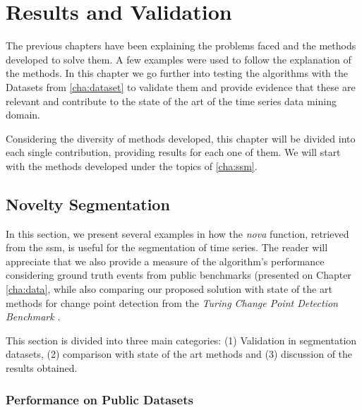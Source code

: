 

%

\chapter{Results and Validation}
\label{cha:results}

The previous chapters have been explaining the problems faced and the methods developed to solve them. A few examples were used to follow the explanation of the methods. In this chapter we go further into testing the algorithms with the Datasets from \ref{cha:dataset} to validate them and provide evidence that these are relevant and contribute to the state of the art of the time series data mining domain.
\par
Considering the diversity of methods developed, this chapter will be divided into each single contribution, providing results for each one of them. We will start with the methods developed under the topics of \ref{cha:ssm}.

\section{Novelty Segmentation}

In this section, we present several examples in how the \textit{nova} function, retrieved from the \gls{ssm}, is useful for the segmentation of time series. The reader will appreciate that we also provide a measure of the algorithm's performance considering ground truth events from public benchmarks (presented on Chapter \ref{cha:data}, while also comparing our proposed solution with state of the art methods for change point detection from the \textit{Turing Change Point Detection Benchmark} \cite{cpd_alan}.
\par
This section is divided into three main categories: (1) Validation in segmentation datasets, (2) comparison with state of the art methods and (3) discussion of the results obtained.

\subsection{Performance on Public Datasets}

